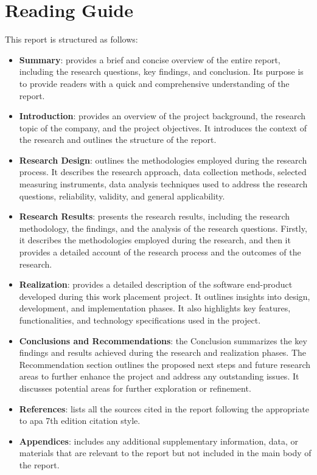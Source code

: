\section{Reading Guide}
This report is structured as follows:
\begin{itemize}
      \item \textbf{Summary}: provides a brief and concise overview of the entire report, including the
            research questions, key findings, and conclusion. Its purpose is to provide readers with a
            quick and comprehensive understanding of the report.
      \item \textbf{Introduction}: provides an overview of the project background, the research topic of the
            company, and the project objectives. It introduces the context of the research and outlines the
            structure of the report.
      \item \textbf{Research Design}: outlines the methodologies employed during the research
            process. It describes the research approach, data collection methods, selected measuring instruments,
            data analysis techniques used to address the research questions, reliability, validity, and general
            applicability.
      \item \textbf{Research Results}: presents the research results, including the research methodology, the findings,
            and the analysis of the research questions. Firstly, it describes the methodologies employed
            during the research, and then it provides a detailed account of the research process and the
            outcomes of the research.
      \item \textbf{Realization}: provides a detailed description of the software end-product developed during
            this work placement project. It outlines insights into design, development, and implementation
            phases. It also highlights key features, functionalities, and technology specifications used in
            the project.
      \item \textbf{Conclusions and Recommendations}: the Conclusion summarizes the key findings and results
            achieved during the research and realization phases. The Recommendation section outlines the
            proposed next steps and future research areas to further enhance the project and address any
            outstanding issues. It discusses potential areas for further exploration or refinement.
      \item \textbf{References}: lists all the sources cited in the report following the appropriate to
            \acrshort{apa} 7th edition citation style.
      \item \textbf{Appendices}: includes any additional supplementary information, data, or materials that
            are relevant to the report but not included in the main body of the report.
\end{itemize}
